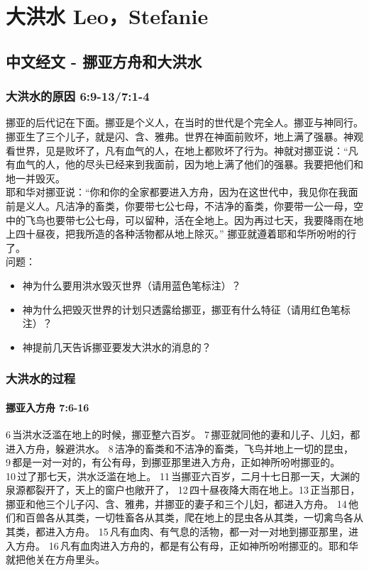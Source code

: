 \chapter{大洪水 Leo，Stefanie}

\section{中文经文 - 挪亚方舟和大洪水}
\subsection{大洪水的原因 6:9-13/7:1-4}

挪亚的后代记在下面。挪亚是个义人，在当时的世代是个完全人。挪亚与神同行。挪亚生了三个儿子，就是闪、含、雅弗。世界在神面前败坏，地上满了强暴。神观看世界，见是败坏了，凡有血气的人，在地上都败坏了行为。神就对挪亚说：“凡有血气的人，他的尽头已经来到我面前，因为地上满了他们的强暴。我要把他们和地一并毁灭。\\

耶和华对挪亚说：“你和你的全家都要进入方舟，因为在这世代中，我见你在我面前是义人。凡洁净的畜类，你要带七公七母，不洁净的畜类，你要带一公一母，空中的飞鸟也要带七公七母，可以留种，活在全地上。因为再过七天，我要降雨在地上四十昼夜，把我所造的各种活物都从地上除灭。” 挪亚就遵着耶和华所吩咐的行了。\\

问题：
\begin{itemize}
\item 神为什么要用洪水毁灭世界（请用蓝色笔标注）？
\item 神为什么把毁灭世界的计划只透露给挪亚，挪亚有什么特征（请用红色笔标注）？
\item 神提前几天告诉挪亚要发大洪水的消息的？
\end{itemize}


\subsection{大洪水的过程}
\subsubsection{挪亚入方舟 7:6-16}
6 当洪水泛滥在地上的时候，挪亚整六百岁。 7 挪亚就同他的妻和儿子、儿妇，都进入方舟，躲避洪水。 8 洁净的畜类和不洁净的畜类，飞鸟并地上一切的昆虫， 9 都是一对一对的，有公有母，到挪亚那里进入方舟，正如神所吩咐挪亚的。 10 过了那七天，洪水泛滥在地上。 11 当挪亚六百岁，二月十七日那一天，大渊的泉源都裂开了，天上的窗户也敞开了， 12 四十昼夜降大雨在地上。13 正当那日，挪亚和他三个儿子闪、含、雅弗，并挪亚的妻子和三个儿妇，都进入方舟。 14 他们和百兽各从其类，一切牲畜各从其类，爬在地上的昆虫各从其类，一切禽鸟各从其类，都进入方舟。 15 凡有血肉、有气息的活物，都一对一对地到挪亚那里，进入方舟。 16 凡有血肉进入方舟的，都是有公有母，正如神所吩咐挪亚的。耶和华就把他关在方舟里头。\\

